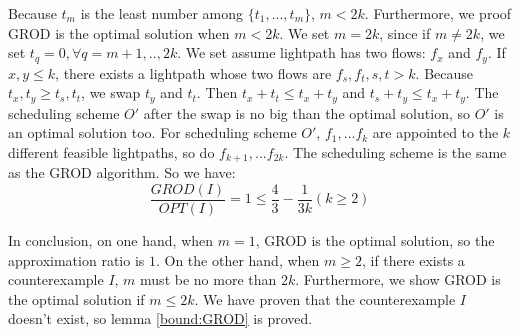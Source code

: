 \begin{IEEEproof}
Because $t_m$ is the least number among $\{t_1,...,t_m\}$, $m<2k$. Furthermore, we proof GROD is the optimal solution when $m<2k$. We set $m=2k$, since if $m\ne2k$, we set $t_q=0,\forall q=m+1,..,2k$. We set assume lightpath has two flows: $f_x$ and $f_y$. If $x,y\leq k$, there exists a lightpath whose two flows are $f_s,f_t,s,t>k$. Because $t_x,t_y\geq t_s,t_t$, we swap $t_y$ and $t_t$. Then $t_x+t_t\leq t_x+t_y$ and $t_s+t_y\leq t_x+t_y$. The scheduling scheme $O'$ after the swap is no big than the optimal solution, so $O'$ is an optimal solution too. For scheduling scheme $O'$, $f_1,...f_k$ are appointed to the $k$ different feasible lightpaths, so do $f_{k+1},...f_{2k}$. The scheduling scheme is the same as the GROD algorithm. So we have:
\begin{equation}
\frac{GROD(I)}{OPT(I)}=1\leq\frac{4}{3}-\frac{1}{3k}(k\geq2)
\end{equation}

In conclusion, on one hand, when $m=1$, GROD is the optimal solution, so the approximation ratio is $1$. On the other hand, when $m\geq2$, if there exists a counterexample $I$, $m$ must be no more than $2k$. Furthermore, we show GROD is the optimal solution if $m\leq2k$. We have proven that the counterexample $I$ doesn't exist, so lemma \ref{bound:GROD} is proved.
\end{IEEEproof}
